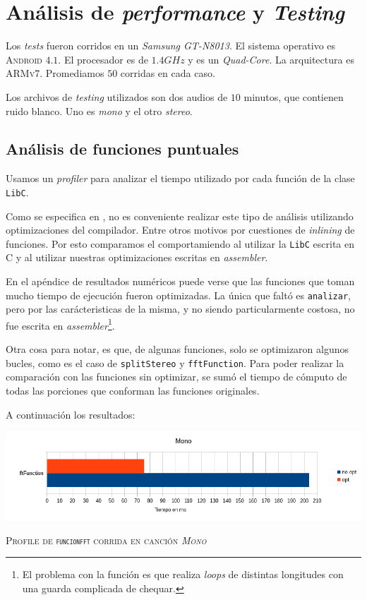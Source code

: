 \documentclass[%
    compressed,
    titlepage,
    narroweqnarray,
    inline,
    twoside,
    ]{ieee}
\begin{document}
\section{An\'alisis de \textit{performance} y \textit{Testing}}

Los \textit{tests} fueron corridos en un \textit{Samsung GT-N8013}.
El sistema operativo es \textsc{Android $4.1$}.
El procesador es de $1.4GHz$ y es un \textit{Quad-Core}.
La arquitectura es \textsc{ARMv7}.
Promediamos $50$ corridas en cada caso.

Los archivos de \textit{testing} utilizados son dos audios de $10$ minutos, que contienen ruido blanco.
Uno es \textit{mono} y el otro \textit{stereo}.

\subsection{An\'alisis de funciones puntuales}
Usamos un \textit{profiler} para analizar el tiempo utilizado por cada funci\'on de la clase \texttt{LibC}.

Como se especifica en \cite[16.1.1 Gprof]{manualARM}, no es conveniente realizar este tipo de an\'alisis utilizando optimizaciones
del compilador. Entre otros motivos por cuestiones de \textit{inlining} de funciones.
Por esto comparamos el comportamiendo al utilizar la \texttt{LibC} escrita en \textsc{C}
y al utilizar nuestras optimizaciones escritas en \textit{assembler}.

En el ap\'endice de resultados num\'ericos puede verse que las funciones que toman mucho tiempo de
ejecuci\'on fueron optimizadas. La \'unica que falt\'o es \texttt{analizar}, pero por las car\'acteristicas
de la misma, y no siendo particularmente costosa, no fue escrita en \textit{assembler}\footnote{El problema con
la funci\'on es que realiza \textit{loops} de distintas longitudes con una guarda complicada
de chequar.}.

Otra cosa para notar, es que, de algunas funciones, solo se optimizaron algunos bucles, como es el caso
de \texttt{splitStereo} y \texttt{fftFunction}. Para poder realizar la comparaci\'on con las funciones
sin optimizar, se sum\'o el tiempo de c\'omputo de todas las porciones que conforman las funciones originales.

A continuaci\'on los resultados:

\includegraphics[width=1\textwidth]{img/fftMono.png}
\begin{center} \textsc{Profile de \texttt{funcionfft} corrida en canci\'on \textit{Mono}} \end{center}
\end{document}
